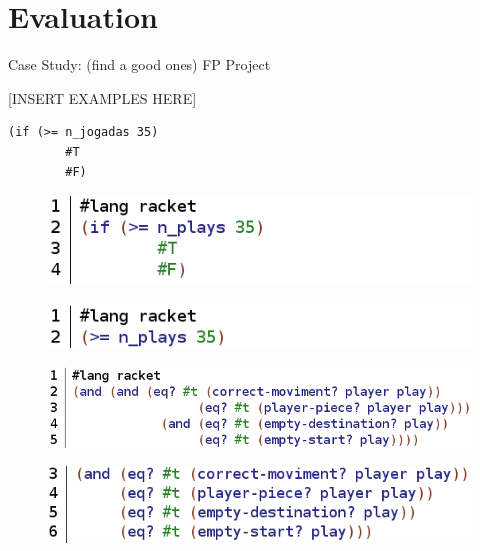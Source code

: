 \section{Evaluation} %
Case Study: (find a good ones) FP Project

[INSERT EXAMPLES HERE]
\begin{lstlisting}[basicstyle=\ttfamily, caption="Sample code"]
  (if (>= n_jogadas 35)
        #T
        #F)
\end{lstlisting}

\begin{figure}
\centering
\includegraphics[width=\linewidth]{images/example1.png}
\label{exampleIfTrueFalse}
\end{figure}

\begin{figure}
\centering
\includegraphics[width=\linewidth]{images/transformation1.png}
\label{exampleIfTrueFalse}
\end{figure}

\begin{figure}
\centering
\includegraphics[width=\linewidth]{images/example2.png}
\label{exampleIfTrueFalse}
\end{figure}

\begin{figure}
\centering
\includegraphics[width=\linewidth]{images/transformation2.png}
\label{exampleIfTrueFalse}
\end{figure}


